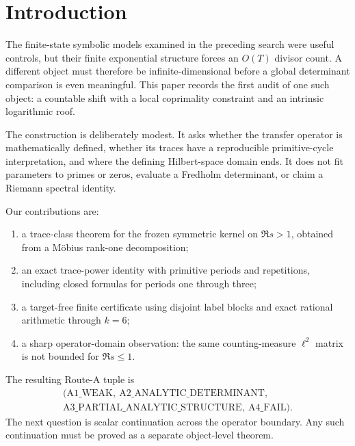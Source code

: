 \section{Introduction}

The finite-state symbolic models examined in the preceding search were useful
controls, but their finite exponential structure forces an \(O(T)\) divisor
count.  A different object must therefore be infinite-dimensional before a
global determinant comparison is even meaningful.  This paper records the
first audit of one such object: a countable shift with a local coprimality
constraint and an intrinsic logarithmic roof.

The construction is deliberately modest.  It asks whether the transfer
operator is mathematically defined, whether its traces have a reproducible
primitive-cycle interpretation, and where the defining Hilbert-space domain
ends.  It does not fit parameters to primes or zeros, evaluate a Fredholm
determinant, or claim a Riemann spectral identity.

Our contributions are:
\begin{enumerate}[leftmargin=1.6em]
\item a trace-class theorem for the frozen symmetric kernel on
      \(\Re s>1\), obtained from a Möbius rank-one decomposition;
\item an exact trace-power identity with primitive periods and repetitions,
      including closed formulas for periods one through three;
\item a target-free finite certificate using disjoint label blocks and exact
      rational arithmetic through \(k=6\);
\item a sharp operator-domain observation: the same counting-measure
      \(\ell^2\) matrix is not bounded for \(\Re s\leq1\).
\end{enumerate}

The resulting Route-A tuple is
\[
\begin{gathered}
(\mathrm{A1\_WEAK},\ \mathrm{A2\_ANALYTIC\_DETERMINANT},\\
\mathrm{A3\_PARTIAL\_ANALYTIC\_STRUCTURE},\ \mathrm{A4\_FAIL}).
\end{gathered}
\]
The next question is scalar continuation across the operator boundary.  Any
such continuation must be proved as a separate object-level theorem.
